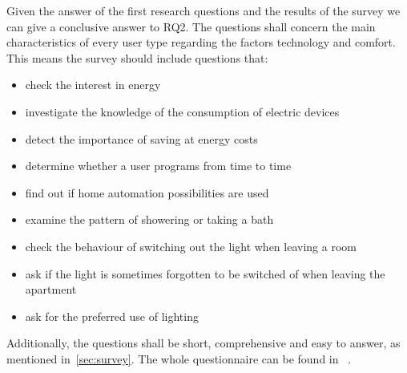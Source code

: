 Given the answer of the first research questions and the results of the survey we can give a conclusive answer to RQ2. The questions shall concern the main characteristics of every user type regarding the factors technology and comfort. This means the survey should include questions that:

\begin{itemize}
	\item check the interest in energy
	\item investigate the knowledge of the consumption of electric devices
	\item detect the importance of saving at energy costs
	\item determine whether a user programs from time to time
	\item find out if home automation possibilities are used
	\item examine the pattern of showering or taking a bath
	\item check the behaviour of switching out the light when leaving a room
	\item ask if the light is sometimes forgotten to be switched of when leaving the apartment
	\item ask for the preferred use of lighting 	
\end{itemize}

Additionally, the questions shall be short, comprehensive and easy to answer, as mentioned in~\ref{sec:survey}. The whole questionnaire can be found in ~.


